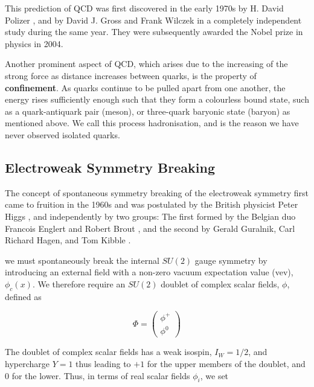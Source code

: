 This prediction of QCD was first discovered in the early 1970s by H. David Polizer \cite{PhysRevLett.30.1346}, and by David J. Gross and Frank 
Wilczek \cite{PhysRevD.8.3633} in a completely independent study during the same year. They were subsequently awarded the Nobel prize in 
physics in 2004.

Another prominent aspect of QCD, which arises due to the increasing of the strong force as distance increases between quarks, is the property 
of \textbf{confinement}. As quarks continue to be pulled apart from one another, the energy rises sufficiently enough such that they 
form a colourless bound state, such as a quark-antiquark pair (meson), or three-quark baryonic state (baryon) as mentioned above. We call this 
process hadronisation, and is the reason we have never observed isolated quarks.  


\subsection{Electroweak Symmetry Breaking} \label{subsec-ElectroweakSymmetryBreaking}

The concept of spontaneous symmetry breaking of the electroweak symmetry first came to fruition in the 1960s and was postulated by the British 
physicist Peter Higgs \cite{PhysRevLett.13.508}, and independently by two groups: The first formed by the Belgian duo Francois Englert and 
Robert Brout \cite{PhysRevLett.13.321}, and the second by Gerald Guralnik, Carl Richard Hagen, and Tom Kibble \cite{PhysRevLett.13.585}.

we must spontaneously break the internal $SU(2)$ gauge symmetry by introducing an external field with a non-zero vacuum expectation value (vev),
$\phi_c(x)$. We therefore require an $SU(2)$ doublet of complex scalar fields, $\phi$, defined as

\begin{equation}
\Phi
= 
\begin{pmatrix}
\phi^+ \\
\phi^0
\end{pmatrix}
\end{equation}

The doublet of complex scalar fields has a weak isospin, $I_W = 1/2$, and hypercharge $Y = 1$ thus leading to $+1$ for the upper members of the doublet, and 0 for the lower. Thus, in terms of real scalar fields $\phi_i$, we set

